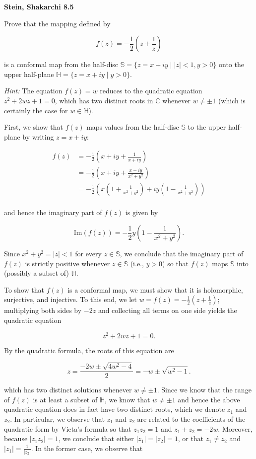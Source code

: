 \textbf{Stein, Shakarchi 8.5}

Prove that the mapping defined by

$$
f(z) = -\frac{1}{2} \left( z + \frac{1}{z} \right)
$$

is a conformal map from the half-disc $\mathbb{S} = \{z = x + iy \mid |z| < 1, y > 0\}$ onto the upper half-plane 
$\mathbb{H} = \{z = x + iy \mid y > 0\}$.

\textit{Hint:} The equation $f(z) = w$ reduces to the quadratic equation $z^2 + 2wz + 1 = 0$, which has two distinct 
roots in $\mathbb{C}$ whenever $w \neq \pm 1$ (which is certainly the case for $w \in \mathbb{H}$).

\begin{solution}
  First, we show that $f(z)$ maps values from the half-disc $\mathbb{S}$ to the upper half-plane by writing 
  $z = x + iy$:

  \begin{align*}
    f(z) &= -\frac{1}{2} \left( x + iy + \frac{1}{x + iy} \right) \\
    &= -\frac{1}{2} \left( x + iy + \frac{x - iy}{x^2 + y^2} \right) \\
    &= -\frac{1}{2} \left( x\left(1 + \frac{1}{x^2 + y^2} \right) + i y \left(1 - \frac{1}{x^2 + y^2} \right) \right) \\
  \end{align*}

  and hence the imaginary part of $f(z)$ is given by

  $$
  \text{Im}(f(z)) = -\frac{1}{2} y \left(1 - \frac{1}{x^2 + y^2} \right).
  $$

  Since $x^2 + y^2 = |z| < 1$ for every $z \in \mathbb{S}$, we conclude that the imaginary part of $f(z)$ is strictly 
  positive whenever $z \in \mathbb{S}$ (i.e., $y > 0$) so that $f(z)$ maps $\mathbb{S}$ into (possibly a subset of) 
  $\mathbb{H}$.

  To show that $f(z)$ is a conformal map, we must show that it is holomorphic, surjective, and injective. To this end, 
  we let $w = f(z) = -\frac{1}{2}\left(z + \frac{1}{z} \right)$; multiplying both sides by $-2z$ and collecting all 
  terms on one side yields the quadratic equation

  $$
  z^2 + 2wz + 1 = 0.
  $$

  By the quadratic formula, the roots of this equation are
  
  $$
  z = \frac{-2w \pm \sqrt{4w^2 - 4}}{2} = -w \pm \sqrt{w^2 - 1}.
  $$

  which has two distinct solutions whenever $w \neq \pm 1$. Since we know that the range of $f(z)$ is at least a subset
  of $\mathbb{H}$, we know that $w \neq \pm 1$ and hence the above quadratic equation does in fact have two
  distinct roots, which we denote $z_1$ and $z_2$. In particular, we observe that $z_1$ and $z_2$ are related to the 
  coefficients of the quadratic form by Vieta's formula so that $z_1 z_2 = 1$ and $z_1 + z_2 = -2w$. Moreover, 
  because $|z_1 z_2| = 1$, we conclude that either $|z_1| = |z_2| = 1$, or that 
  $z_1 \neq z_2$ and $|z_1| = \frac{1}{|z_2|}$. In the former case, we observe that


\end{solution}
